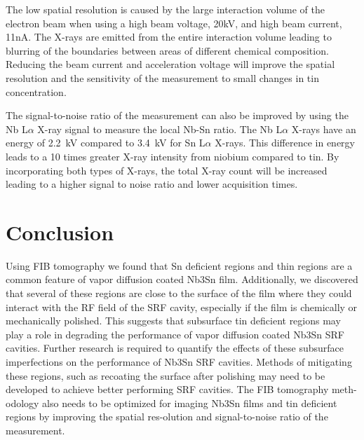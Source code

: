 The low spatial resolution is caused by the large interaction volume of the electron beam when using a high beam voltage, 20kV, and high beam current, 11nA. The X-rays are emitted from the entire interaction volume leading to blurring of the boundaries between areas of different chemical composition. Reducing the beam current and acceleration voltage will improve the spatial resolution and the sensitivity of the measurement to small changes in tin concentration. 

The signal-to-noise ratio of the measurement can also be improved by using the Nb L$\alpha$ X-ray signal to measure the local Nb-Sn ratio. The Nb L$\alpha$ X-rays have an energy of \qty{2.2}{\kilo\volt} compared to \qty{3.4}{\kilo\volt} for Sn L$\alpha$ X-rays\cite{osti_4794153}. This difference in energy leads to a 10 times greater X-ray intensity from niobium compared to tin. By incorporating both types of X-rays, the total X-ray count will be increased leading to a higher signal to noise ratio and lower acquisition times.


\section{Conclusion}

Using FIB tomography we found that Sn deficient regions and thin regions are a common feature of vapor diffusion coated Nb3Sn film. Additionally, we discovered that several of these regions are close to the surface of the film where they could interact with the RF field of the SRF cavity, especially if the film is chemically or mechanically polished. This suggests that subsurface tin deficient regions may play a role in degrading the performance of vapor diffusion coated Nb3Sn SRF cavities. Further research is required to quantify the effects of these subsurface imperfections on the performance of Nb3Sn SRF cavities. Methods of mitigating these regions, such as recoating the surface after polishing may need to be developed to achieve better performing SRF cavities. The FIB tomography meth-odology also needs to be optimized for imaging Nb3Sn films and tin deficient regions by improving the spatial res-olution and signal-to-noise ratio of the measurement.
